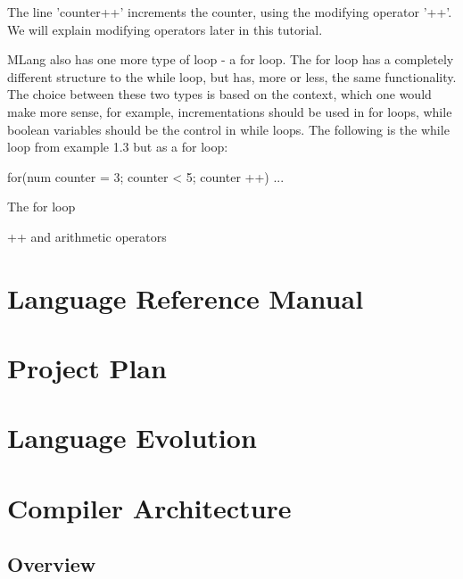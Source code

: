 \documentclass{l3proj}
\begin{document}
The line 'counter++' increments the counter, using the modifying operator '++'. We will explain modifying operators later in this tutorial.

MLang also has one more type of loop - a for loop. The for loop has a completely different structure to the while loop, but has, more or less, the same functionality. The choice between these two types is based on the context, which one would make more sense, for example, incrementations should be used in for loops, while boolean variables should be the control in while loops. The following is the while loop from example 1.3 but as a for loop:
\begin{lstListing}
for(num counter = 3; counter < 5; counter ++){
...
}
\end{lstListing}
The for loop 




++ and arithmetic operators



\chapter{Language Reference Manual}
\label{manual}

\chapter{Project Plan}
\label{plan}

\chapter{Language Evolution}
\label{evo}

\chapter{Compiler Architecture}
\label{arch}

\section{Overview}
\label{arch-over}
\end{document}
